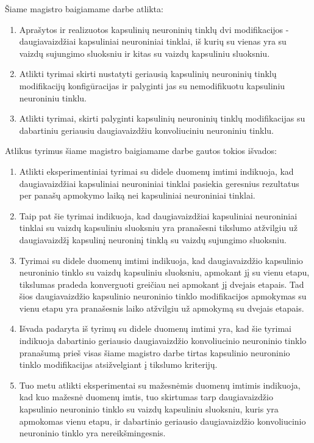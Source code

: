 
Šiame magistro baigiamame darbe atlikta:

\begin{enumerate}
	\item Aprašytos ir realizuotos kapsulinių neuroninių tinklų dvi modifikacijos - daugiavaizdžiai kapsuliniai neuroniniai tinklai, iš kurių su vienas yra su vaizdų sujungimo sluoksniu ir kitas su vaizdų kapsuliniu sluoksniu.
	\item Atlikti tyrimai skirti nustatyti geriausią kapsulinių neuroninių tinklų modifikacijų konfigūracijas ir palyginti jas su nemodifikuotu kapsuliniu neuroniniu tinklu.
	\item Atlikti tyrimai, skirti palyginti kapsulinių neuroninių tinklų modifikacijas su dabartiniu geriausiu daugiavaizdžiu konvoliuciniu neuroniniu tinklu.
\end{enumerate}

Atlikus tyrimus šiame magistro baigiamame darbe gautos tokios išvados:

\begin{enumerate}
	\item Atlikti eksperimentiniai tyrimai su didele duomenų imtimi indikuoja, kad daugiavaizdžiai kapsuliniai neuroniniai tinklai pasiekia geresnius rezultatus per panašų apmokymo laiką nei kapsuliniai neuroniniai tinklai.
	\item Taip pat šie tyrimai indikuoja, kad daugiavaizdžiai kapsuliniai neuroniniai tinklai su vaizdų kapsuliniu sluoksniu yra pranašesni tikslumo atžvilgiu už daugiavaizdžį kapsulinį neuroninį tinklą su vaizdų sujungimo sluoksniu.
	\item Tyrimai su didele duomenų imtimi indikuoja, kad daugiavaizdžio kapsulinio neuroninio tinklo su vaizdų kapsuliniu sluoksniu, apmokant jį su vienu etapu, tikslumas pradeda konverguoti greičiau nei apmokant jį dvejais etapais. Tad šios daugiavaizdžio kapsulinio neuroninio tinklo modifikacijos apmokymas su vienu etapu yra pranašesnis laiko atžvilgiu už apmokymą su dvejais etapais.
	\item Išvada padaryta iš tyrimų su didele duomenų imtimi yra, kad šie tyrimai indikuoja dabartinio geriausio daugiavaizdžio konvoliucinio neuroninio tinklo pranašumą prieš visas šiame magistro darbe tirtas kapsulinio neuroninio tinklo modifikacijas atsižvelgiant į tikslumo kriterijų.
	\item Tuo metu atlikti eksperimentai su mažesnėmis duomenų imtimis indikuoja, kad kuo mažesnė duomenų imtis, tuo skirtumas tarp daugiavaizdžio kapsulinio neuroninio tinklo su vaizdų kapsuliniu sluoksniu, kuris yra apmokomas vienu etapu, ir dabartinio geriausio daugiavaizdžio konvoliucinio neuroninio tinklo yra nereikšmingesnis.
\end{enumerate}

